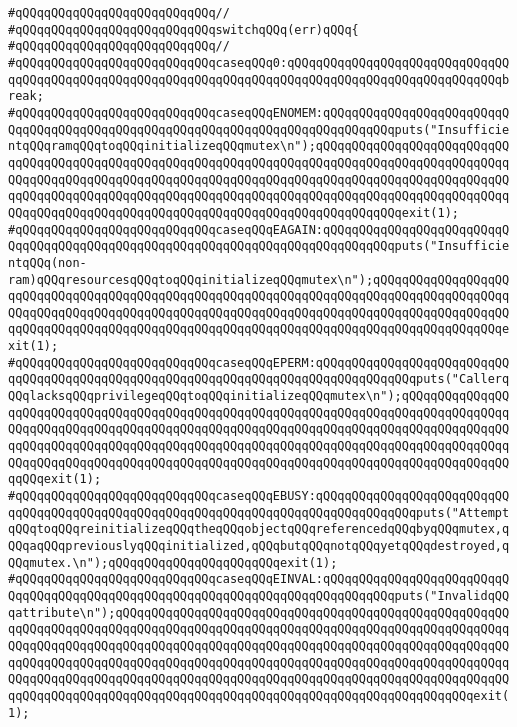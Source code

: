\verb|#qQQqqQQqqQQqqQQqqQQqqQQqqQQq//|\newline
\verb|#qQQqqQQqqQQqqQQqqQQqqQQqqQQqswitchqQQq(err)qQQq{|\newline
\verb|#qQQqqQQqqQQqqQQqqQQqqQQqqQQq//|\newline
\verb|#qQQqqQQqqQQqqQQqqQQqqQQqqQQqcaseqQQq0:qQQqqQQqqQQqqQQqqQQqqQQqqQQqqQQqqQQqqQQqqQQqqQQqqQQqqQQqqQQqqQQqqQQqqQQqqQQqqQQqqQQqqQQqqQQqqQQqqQQqbreak;|\newline
\verb|#qQQqqQQqqQQqqQQqqQQqqQQqqQQqcaseqQQqENOMEM:qQQqqQQqqQQqqQQqqQQqqQQqqQQqqQQqqQQqqQQqqQQqqQQqqQQqqQQqqQQqqQQqqQQqqQQqqQQqqQQqputs("InsufficientqQQqramqQQqtoqQQqinitializeqQQqmutex\n");qQQqqQQqqQQqqQQqqQQqqQQqqQQqqQQqqQQqqQQqqQQqqQQqqQQqqQQqqQQqqQQqqQQqqQQqqQQqqQQqqQQqqQQqqQQqqQQqqQQqqQQqqQQqqQQqqQQqqQQqqQQqqQQqqQQqqQQqqQQqqQQqqQQqqQQqqQQqqQQqqQQqqQQqqQQqqQQqqQQqqQQqqQQqqQQqqQQqqQQqqQQqqQQqqQQqqQQqqQQqqQQqqQQqqQQqqQQqqQQqqQQqqQQqqQQqqQQqqQQqqQQqqQQqqQQqqQQqqQQqqQQqqQQqqQQqexit(1);|\newline
\verb|#qQQqqQQqqQQqqQQqqQQqqQQqqQQqcaseqQQqEAGAIN:qQQqqQQqqQQqqQQqqQQqqQQqqQQqqQQqqQQqqQQqqQQqqQQqqQQqqQQqqQQqqQQqqQQqqQQqqQQqqQQqputs("InsufficientqQQq(non-ram)qQQqresourcesqQQqtoqQQqinitializeqQQqmutex\n");qQQqqQQqqQQqqQQqqQQqqQQqqQQqqQQqqQQqqQQqqQQqqQQqqQQqqQQqqQQqqQQqqQQqqQQqqQQqqQQqqQQqqQQqqQQqqQQqqQQqqQQqqQQqqQQqqQQqqQQqqQQqqQQqqQQqqQQqqQQqqQQqqQQqqQQqqQQqqQQqqQQqqQQqqQQqqQQqqQQqqQQqqQQqqQQqqQQqqQQqqQQqqQQqqQQqqQQqqQQqqQQqqQQqexit(1);|\newline
\verb|#qQQqqQQqqQQqqQQqqQQqqQQqqQQqcaseqQQqEPERM:qQQqqQQqqQQqqQQqqQQqqQQqqQQqqQQqqQQqqQQqqQQqqQQqqQQqqQQqqQQqqQQqqQQqqQQqqQQqqQQqqQQqputs("CallerqQQqlacksqQQqprivilegeqQQqtoqQQqinitializeqQQqmutex\n");qQQqqQQqqQQqqQQqqQQqqQQqqQQqqQQqqQQqqQQqqQQqqQQqqQQqqQQqqQQqqQQqqQQqqQQqqQQqqQQqqQQqqQQqqQQqqQQqqQQqqQQqqQQqqQQqqQQqqQQqqQQqqQQqqQQqqQQqqQQqqQQqqQQqqQQqqQQqqQQqqQQqqQQqqQQqqQQqqQQqqQQqqQQqqQQqqQQqqQQqqQQqqQQqqQQqqQQqqQQqqQQqqQQqqQQqqQQqqQQqqQQqqQQqqQQqqQQqqQQqqQQqqQQqqQQqqQQqqQQqqQQqqQQqqQQqqQQqqQQqexit(1);|\newline
\verb|#qQQqqQQqqQQqqQQqqQQqqQQqqQQqcaseqQQqEBUSY:qQQqqQQqqQQqqQQqqQQqqQQqqQQqqQQqqQQqqQQqqQQqqQQqqQQqqQQqqQQqqQQqqQQqqQQqqQQqqQQqqQQqputs("AttemptqQQqtoqQQqreinitializeqQQqtheqQQqobjectqQQqreferencedqQQqbyqQQqmutex,qQQqaqQQqpreviouslyqQQqinitialized,qQQqbutqQQqnotqQQqyetqQQqdestroyed,qQQqmutex.\n");qQQqqQQqqQQqqQQqqQQqqQQqexit(1);|\newline
\verb|#qQQqqQQqqQQqqQQqqQQqqQQqqQQqcaseqQQqEINVAL:qQQqqQQqqQQqqQQqqQQqqQQqqQQqqQQqqQQqqQQqqQQqqQQqqQQqqQQqqQQqqQQqqQQqqQQqqQQqqQQqputs("InvalidqQQqattribute\n");qQQqqQQqqQQqqQQqqQQqqQQqqQQqqQQqqQQqqQQqqQQqqQQqqQQqqQQqqQQqqQQqqQQqqQQqqQQqqQQqqQQqqQQqqQQqqQQqqQQqqQQqqQQqqQQqqQQqqQQqqQQqqQQqqQQqqQQqqQQqqQQqqQQqqQQqqQQqqQQqqQQqqQQqqQQqqQQqqQQqqQQqqQQqqQQqqQQqqQQqqQQqqQQqqQQqqQQqqQQqqQQqqQQqqQQqqQQqqQQqqQQqqQQqqQQqqQQqqQQqqQQqqQQqqQQqqQQqqQQqqQQqqQQqqQQqqQQqqQQqqQQqqQQqqQQqqQQqqQQqqQQqqQQqqQQqqQQqqQQqqQQqqQQqqQQqqQQqqQQqqQQqqQQqqQQqqQQqqQQqqQQqqQQqqQQqqQQqqQQqexit(1);|\newline
